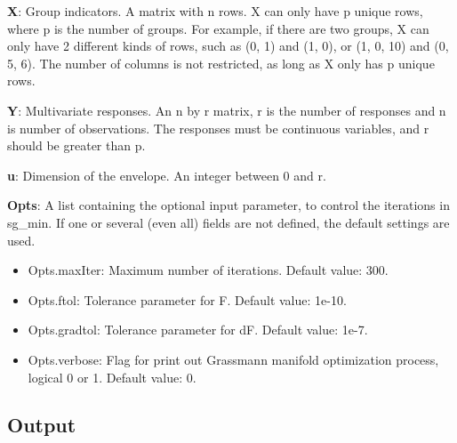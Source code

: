 \documentclass[a4paper,11pt,openany]{memoir}
\begin{document}
\begin{par}
\textbf{X}: Group indicators. A matrix with n rows.  X can only have p unique  rows, where p is the number of groups. For example, if there are two groups, X can only have 2 different kinds of rows, such as (0, 1) and (1, 0), or (1, 0, 10) and (0, 5, 6).  The number of columns is not restricted, as long as X only has p unique rows.
\end{par} \vspace{1em}
\begin{par}
\textbf{Y}: Multivariate responses. An n by r matrix, r is the number of responses and n is number of observations. The responses must be continuous variables, and r should be greater than p.
\end{par} \vspace{1em}
\begin{par}
\textbf{u}: Dimension of the envelope. An integer between 0 and r.
\end{par} \vspace{1em}
\begin{par}
\textbf{Opts}: A list containing the optional input parameter, to control the iterations in sg\_min. If one or several (even all) fields are not defined, the default settings are used.
\end{par} \vspace{1em}
\begin{itemize}
\setlength{\itemsep}{-1ex}
   \item Opts.maxIter: Maximum number of iterations.  Default value: 300.
   \item Opts.ftol: Tolerance parameter for F.  Default value: 1e-10.
   \item Opts.gradtol: Tolerance parameter for dF.  Default value: 1e-7.
   \item Opts.verbose: Flag for print out Grassmann manifold optimization process, logical 0 or 1. Default value: 0.
\end{itemize}


\subsection*{Output}
\end{document}
